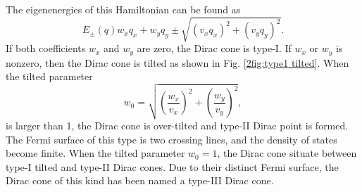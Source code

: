     The eigenenergies of this Hamiltonian can be found as
    \begin{equation} \label{2eq:eigenenergies}
        E_{\pm}(q) w_{x}q_x + w_{y}q_y \pm \sqrt{(v_x q_x)^2 + (v_y q_y)^2}.
    \end{equation}
    If both coefficients $w_{x}$ and $w_{y}$ are zero, the Dirac cone is type-I.
    If $w_{x}$ or $w_{y}$ is nonzero, then the Dirac cone is tilted as shown in Fig. \ref{2fig:type1 tilted}.
    When the tilted parameter
    \begin{equation} \label{2eq:tilted parameter}
        w_0 = \sqrt{\left(\frac{w_x}{v_x}\right)^2 + \left(\frac{w_y}{v_y}\right)^2},
    \end{equation}
    is larger than 1, the Dirac cone is over-tilted and type-II Dirac point is formed.
    The Fermi surface of this type is two crossing lines, and the density of states become finite.
    When the tilted parameter $w_0 = 1$, the Dirac cone situate between type-I tilted and type-II Dirac cones.
    Due to their distinct Fermi surface, the Dirac cone of this kind has been named a type-III Dirac cone.
